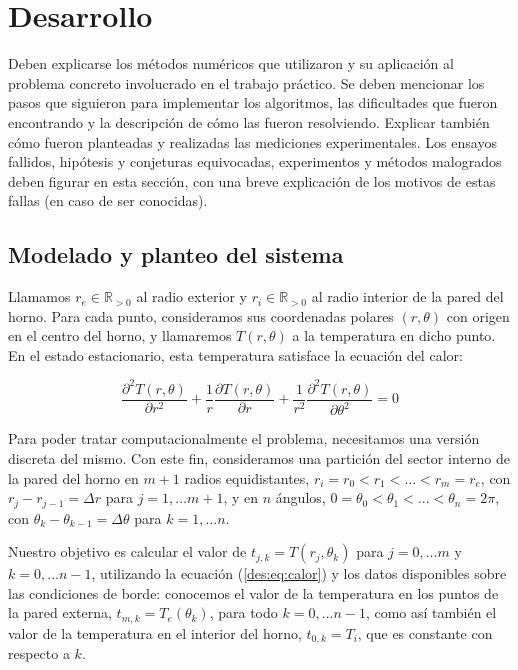\section{Desarrollo}

  {\color{Gray} Deben explicarse los métodos numéricos que utilizaron y su aplicación al problema concreto involucrado en el trabajo práctico. Se deben mencionar los pasos que siguieron para implementar los algoritmos, las dificultades que fueron encontrando y la descripción de cómo las fueron resolviendo. Explicar también cómo fueron planteadas y realizadas las mediciones experimentales. Los ensayos fallidos, hipótesis y conjeturas equivocadas, experimentos y métodos malogrados deben figurar en esta sección, con una breve explicación de los motivos de estas fallas (en caso de ser conocidas).}

  \subsection{Modelado y planteo del sistema}

    Llamamos $r_e \in \mathbb{R}_{>0}$ al radio exterior y $r_i \in \mathbb{R}_{>0}$ al radio interior de la pared del horno. Para cada punto, consideramos sus coordenadas polares $(r, \theta)$ con origen en el centro del horno, y llamaremos $T(r, \theta)$ a la temperatura en dicho punto. En el estado estacionario, esta temperatura satisface la ecuación del calor:

    \begin{equation} \label{des:eq:calor}
      \frac{\partial^2 T(r, \theta)}{\partial r^2} + \frac{1}{r} \frac{\partial T(r, \theta)}{\partial r} + \frac{1}{r^2} \frac{\partial^2 T(r, \theta)}{\partial \theta^2} = 0
    \end{equation}

    Para poder tratar computacionalmente el problema, necesitamos una versión discreta del mismo. Con este fin, consideramos una partición del sector interno de la pared del horno en $m + 1$ radios equidistantes, $r_i = r_0 < r_1 < \dots < r_m = r_e$, con $r_j - r_{j-1} = \Delta r$ para $j = 1, \dots m+1$, y en $n$ ángulos, $0 = \theta_0 < \theta_1 < ... < \theta_n = 2\pi$, con $\theta_k - \theta_{k-1} = \Delta \theta$ para $k = 1, \dots n$.

    Nuestro objetivo es calcular el valor de $t_{j,k} = T(r_j, \theta_k)$ para $j = 0, \dots m$ y $k = 0, \dots n-1$, utilizando la ecuación (\ref{des:eq:calor}) y los datos disponibles sobre las condiciones de borde: conocemos el valor de la temperatura en los puntos de la pared externa, $t_{m,k} = T_e(\theta_k)$, para todo $k = 0, \dots n-1$, como así también el valor de la temperatura en el interior del horno, $t_{0,k} = T_i$, que es constante con respecto a $k$.


